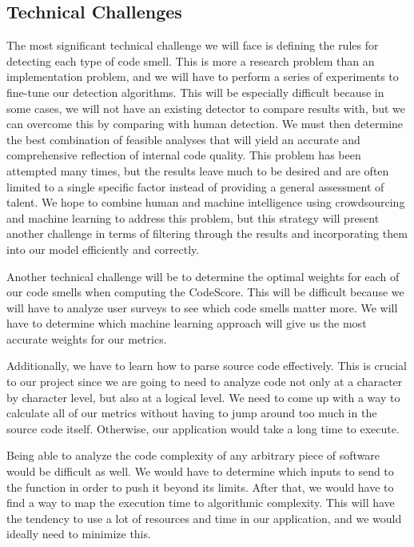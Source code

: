 \documentclass{sig-alternate}
\begin{document}
\subsection{Technical Challenges}
\label{subsec:tech_challenges}

The most significant technical challenge we will face is defining the rules for detecting each type of code smell. This is more a research problem than an implementation problem, and we will have to perform a series of experiments to fine-tune our detection algorithms. This will be especially difficult because in some cases, we will not have an existing detector to compare results with, but we can overcome this by comparing with human detection. We must then determine the best combination of feasible analyses that will yield an accurate and comprehensive reflection of internal code quality. This problem has been attempted many times, but the results leave much to be desired and are often limited to a single specific factor instead of providing a general assessment of talent. We hope to combine human and machine intelligence using crowdsourcing and machine learning to address this problem, but this strategy will present another challenge in terms of filtering through the results and incorporating them into our model efficiently and correctly.

Another technical challenge will be to determine the optimal weights for each of our code smells when computing the CodeScore. This will be difficult because we will have to analyze user surveys to see which code smells matter more. We will have to determine which machine learning approach will give us the most accurate weights for our metrics. 

Additionally, we have to learn how to parse source code effectively. This is crucial to our project since we are going to need to analyze code not only at a character by character level, but also at a logical level. We need to come up with a way to calculate all of our metrics without having to jump around too much in the source code itself. Otherwise, our application would take a long time to execute.

Being able to analyze the code complexity of any arbitrary piece of software would be difficult as well. We would have to determine which inputs to send to the function in order to push it beyond its limits. After that, we would have to find a way to map the execution time to algorithmic complexity. This will have the tendency to use a lot of resources and time in our application, and we would ideally need to minimize this.
\end{document}
